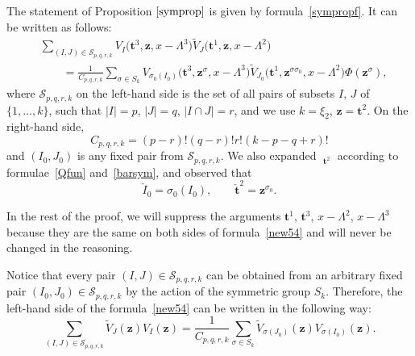 \documentclass[pdftex]{sigma}
\numberwithin{equation}{section}
\DeclareMathOperator{\Symb}{\overline{Sym} }
\begin{document}
The statement of Proposition $\ref{symprop}$ is given by formula~\eqref{sympropf}. It can be written as follows:
\begin{align}
&\sum\limits_{(I,J)\in \mathcal{S}_{p,q,r,k}}V_{I}\bigl(\boldsymbol{t}^3, \boldsymbol{z},x-\Lambda^3\bigr) \widetilde{V}_{J}\bigl( \boldsymbol{t}^1, \boldsymbol{z},x-\Lambda^2\bigr) \nonumber\\
&\qquad{}=\frac{1}{C_{p,q,r,k}}\sum_{\sigma\in S_k} V_{\sigma_0({I}_0)}\bigl(\boldsymbol{t}^3, \boldsymbol{z}^{\sigma},x-\Lambda^3\bigr) \widetilde{V}_{J_0}\bigl( \boldsymbol{t}^1, \boldsymbol{z}^{\sigma\sigma_0},x-\Lambda^2\bigr) \Phi(\boldsymbol{z}^\sigma),\label{new54}
\end{align}
where $\mathcal S_{p,q,r,k}$ on the left-hand side is the set of all pairs of subsets $I$, $J$ of $\{1,\dots,k \}$, such that $|I|=p$, $|J|=q$, $|I\cap J|=r$, and we use $k=\xi_2$, $\boldsymbol{z}=\boldsymbol{t}^2$. On the right-hand side,
\[
C_{p,q,r,k}= (p-r)!(q-r)! r!(k-p-q+r)!
\]
 and $(I_0,J_0)$  is any fixed pair from $\mathcal S_{p,q,r,k}$. We also expanded $\Symb_{\boldsymbol{t}^2}$ according to formulae~\eqref{Qfun} and~\eqref{barsym}, and observed that
 \[
 \check{I}_0=\sigma_0(I_0) , \qquad \check{\boldsymbol{t}}^2=\boldsymbol{z}^{\sigma_0}.
 \]

In the rest of the proof, we will suppress the arguments $\boldsymbol{t}^1$, $\boldsymbol{t}^3$, $x-\Lambda^2$, $x-\Lambda^3$ because they are the same on both sides of formula~\eqref{new54} and will never be changed in the reasoning.

Notice that every pair $(I,J)\in \mathcal{S}_{p,q,r,k}$ can be obtained from an arbitrary fixed pair $(I_0,J_0) \in \mathcal{S}_{p,q,r,k}$ by the action of the symmetric group $S_k$. Therefore, the left-hand side of the formula~\eqref{new54} can be written in the following way:
\begin{equation}\label{twosums}
\sum_{(I,J)\in \mathcal{S}_{p,q,r,k}}\widetilde{V}_J( \boldsymbol{z}) V_I(\boldsymbol{z})=\frac{1}{C_{p,q,r,k}}\sum_{\sigma\in S_k} \widetilde{V}_{\sigma(J_0)}(\boldsymbol{z}) V_{\sigma(I_0)}(\boldsymbol{z} ).
\end{equation}
\end{document}
